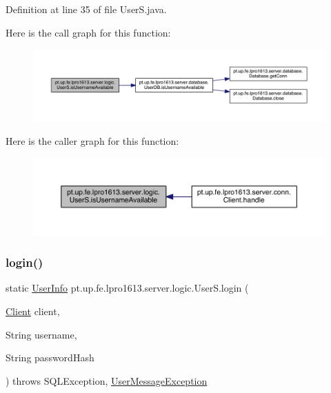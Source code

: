 Definition at line 35 of file User\+S.\+java.

Here is the call graph for this function\+:
\nopagebreak
\begin{figure}[H]
\begin{center}
\leavevmode
\includegraphics[width=350pt]{classpt_1_1up_1_1fe_1_1lpro1613_1_1server_1_1logic_1_1_user_s_a9c89c0a0ef730b38021033e58f7911cd_cgraph}
\end{center}
\end{figure}
Here is the caller graph for this function\+:
\nopagebreak
\begin{figure}[H]
\begin{center}
\leavevmode
\includegraphics[width=350pt]{classpt_1_1up_1_1fe_1_1lpro1613_1_1server_1_1logic_1_1_user_s_a9c89c0a0ef730b38021033e58f7911cd_icgraph}
\end{center}
\end{figure}
\hypertarget{classpt_1_1up_1_1fe_1_1lpro1613_1_1server_1_1logic_1_1_user_s_a501230613cfd4f8fee1949c3f116f0ac}{}\label{classpt_1_1up_1_1fe_1_1lpro1613_1_1server_1_1logic_1_1_user_s_a501230613cfd4f8fee1949c3f116f0ac} 
\subsubsection{\texorpdfstring{login()}{login()}}
{\footnotesize\ttfamily static \hyperlink{classpt_1_1up_1_1fe_1_1lpro1613_1_1sharedlib_1_1structs_1_1_user_info}{User\+Info} pt.\+up.\+fe.\+lpro1613.\+server.\+logic.\+User\+S.\+login (\begin{DoxyParamCaption}\item[{\hyperlink{classpt_1_1up_1_1fe_1_1lpro1613_1_1server_1_1conn_1_1_client}{Client}}]{client,  }\item[{String}]{username,  }\item[{String}]{password\+Hash }\end{DoxyParamCaption}) throws S\+Q\+L\+Exception, \hyperlink{classpt_1_1up_1_1fe_1_1lpro1613_1_1sharedlib_1_1exceptions_1_1_user_message_exception}{User\+Message\+Exception}\hspace{0.3cm}{\ttfamily [static]}}

